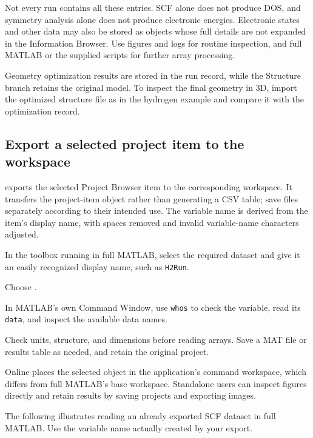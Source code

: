 Not every run contains all these entries. SCF alone does not produce DOS, and symmetry analysis alone does not produce electronic energies. Electronic states and other data may also be stored as objects whose full details are not expanded in the Information Browser. Use figures and logs for routine inspection, and full MATLAB\regmark{} or the supplied scripts for further array processing.

Geometry optimization results are stored in the run record, while the Structure branch retains the original model. To inspect the final geometry in 3D, import the optimized structure file as in the hydrogen example and compare it with the optimization record.

\subsection{Export a selected project item to the workspace}

 exports the selected Project Browser item to the corresponding workspace. It transfers the project-item object rather than generating a CSV table; save files separately according to their intended use. The variable name is derived from the item's display name, with spaces removed and invalid variable-name characters adjusted.

\begin{steps}
\item In the toolbox running in full MATLAB\regmark{}, select the required dataset and give it an easily recognized display name, such as \texttt{H2Run}.
\item Choose .
\item In MATLAB\regmark{}'s own Command Window, use \texttt{whos} to check the variable, read its \texttt{data}, and inspect the available data names.
\item Check units, structure, and dimensions before reading arrays. Save a MAT file or results table as needed, and retain the original project.
\end{steps}

Online places the selected object in the application's command workspace, which differs from full MATLAB\regmark{}'s base workspace. Standalone users can inspect figures directly and retain results by saving projects and exporting images.

The following illustrates reading an already exported SCF dataset in full MATLAB\regmark{}. Use the variable name actually created by your export.

